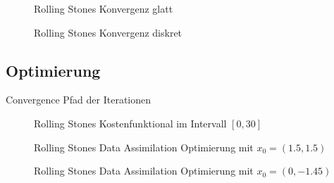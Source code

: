 \begin{figure}[H]
\centering
\begin{minipage}[b]{0.49\linewidth}

\caption{Rolling Stones Konvergenz glatt}
\label{fig:rollingStonesAdjointSmooth}
\end{minipage}
\begin{minipage}[b]{0.49\linewidth}

\caption{Rolling Stones Konvergenz diskret}
\label{fig:rollingStonesAdjointDiscrete}
\end{minipage}
\end{figure}

\subsection{Optimierung}
Convergence
Pfad der Iterationen
\begin{figure}[H]
\centering

\caption{Rolling Stones Kostenfunktional im Intervall $[0,30]$}
\label{fig:rolling_costfunctional}
\end{figure}



\begin{figure}[H]
\centering
\begin{minipage}[b]{0.49\linewidth}

\end{minipage}
\begin{minipage}[b]{0.49\linewidth}

\end{minipage}
\caption{Rolling Stones Data Assimilation Optimierung mit $x_0=(1.5,1.5)$}
\label{fig:rollingStonesOpt1}
\end{figure}


\begin{figure}[H]
\centering
\begin{minipage}[b]{0.49\linewidth}

\end{minipage}
\begin{minipage}[b]{0.49\linewidth}

\end{minipage}
\caption{Rolling Stones Data Assimilation Optimierung mit $x_0=(0,-1.45)$}
\label{fig:rollingStonesOpt1}
\end{figure}



